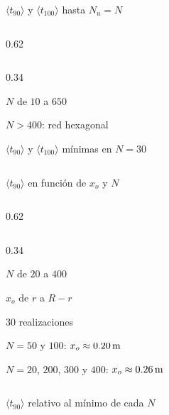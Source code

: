 \begin{frame}{$\langle t_{90}\rangle$ y $\langle t_{100}\rangle$ hasta $N_u = N$}
  \begin{cols}
    \begin{column}{0.62\textwidth}
    \end{column}
    \begin{column}{0.34\textwidth}
      \begin{parametros}
        \item $N$ de $10$ a $650$
        \item $N > 400$: red hexagonal
      \end{parametros}
      \begin{resultado}
        \item $\langle t_{90}\rangle$ y $\langle t_{100}\rangle$ mínimas en $N = 30$
      \end{resultado}
    \end{column}
  \end{cols}
\end{frame}

\begin{frame}{$\langle t_{90}\rangle$ en función de $x_o$ y $N$}
  \begin{cols}
    \begin{column}{0.62\textwidth}
    \end{column}
    \begin{column}{0.34\textwidth}
      \begin{parametros}
        \item $N$ de $20$ a $400$
        \item $x_o$ de $r$ a $R - r$
        \item $30$ realizaciones
      \end{parametros}
      \begin{resultado}
        \item $N = 50$ y $100$: $x_o \approx 0.20\,\mathrm{m}$
        \item $N = 20$, $200$, $300$ y $400$: $x_o \approx 0.26\,\mathrm{m}$
      \end{resultado}
    \end{column}
  \end{cols}
\end{frame}

\begin{frame}{$\langle t_{90}\rangle$ relativo al mínimo de cada $N$}
  \centering
\end{frame}

